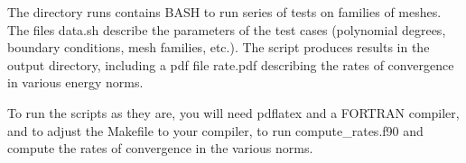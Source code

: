 The directory {\ttfamily runs} contains B\+A\+SH to run series of tests on families of meshes. The files {\ttfamily data.\+sh} describe the parameters of the test cases (polynomial degrees, boundary conditions, mesh families, etc.). The script produces results in the {\ttfamily output} directory, including a pdf file {\ttfamily rate.\+pdf} describing the rates of convergence in various energy norms.

To run the scripts as they are, you will need {\ttfamily pdflatex} and a F\+O\+R\+T\+R\+AN compiler, and to adjust the {\ttfamily Makefile} to your compiler, to run {\ttfamily compute\+\_\+rates.\+f90} and compute the rates of convergence in the various norms. 